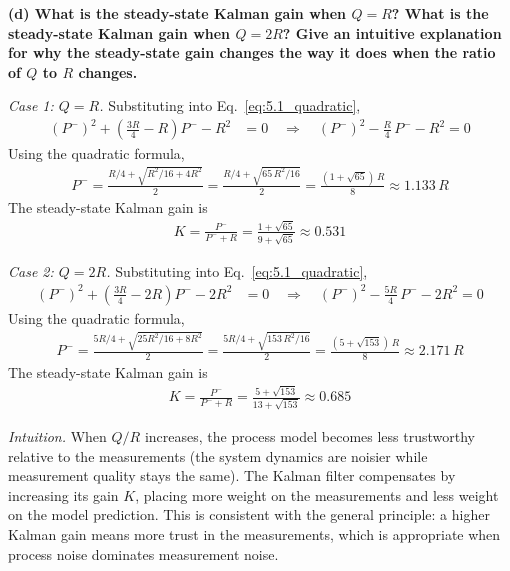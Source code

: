 \documentclass[12pt]{article}
\begin{document}
\begin{stepbox}
\textbf{(d) What is the steady-state Kalman gain when $Q = R$? What is the steady-state Kalman gain when $Q = 2R$? Give an intuitive explanation for why the steady-state gain changes the way it does when the ratio of $Q$ to $R$ changes.}

\vspace{0.3cm}

\textit{Case 1: $Q = R$.} Substituting into Eq.~\eqref{eq:5.1_quadratic},
\begin{align}
(P^-)^2 + \left(\tfrac{3R}{4} - R\right)P^- - R^2 &= 0 \quad\Longrightarrow\quad (P^-)^2 - \tfrac{R}{4}\,P^- - R^2 = 0
\end{align}
Using the quadratic formula,
\begin{align}
P^- = \frac{R/4 + \sqrt{R^2/16 + 4R^2}}{2} = \frac{R/4 + \sqrt{65\,R^2/16}}{2} = \frac{(1 + \sqrt{65})\,R}{8} \approx 1.133\,R
\end{align}
The steady-state Kalman gain is
\begin{align}
K = \frac{P^-}{P^- + R} = \frac{1+\sqrt{65}}{9+\sqrt{65}} \approx \boxed{0.531}
\end{align}

\textit{Case 2: $Q = 2R$.} Substituting into Eq.~\eqref{eq:5.1_quadratic},
\begin{align}
(P^-)^2 + \left(\tfrac{3R}{4} - 2R\right)P^- - 2R^2 &= 0 \quad\Longrightarrow\quad (P^-)^2 - \tfrac{5R}{4}\,P^- - 2R^2 = 0
\end{align}
Using the quadratic formula,
\begin{align}
P^- = \frac{5R/4 + \sqrt{25R^2/16 + 8R^2}}{2} = \frac{5R/4 + \sqrt{153\,R^2/16}}{2} = \frac{(5 + \sqrt{153})\,R}{8} \approx 2.171\,R
\end{align}
The steady-state Kalman gain is
\begin{align}
K = \frac{P^-}{P^- + R} = \frac{5+\sqrt{153}}{13+\sqrt{153}} \approx \boxed{0.685}
\end{align}

\textit{Intuition.} When $Q/R$ increases, the process model becomes less trustworthy relative to the measurements (the system dynamics are noisier while measurement quality stays the same). The Kalman filter compensates by increasing its gain $K$, placing more weight on the measurements and less weight on the model prediction. This is consistent with the general principle: a higher Kalman gain means more trust in the measurements, which is appropriate when process noise dominates measurement noise.

\end{stepbox}
\end{document}
